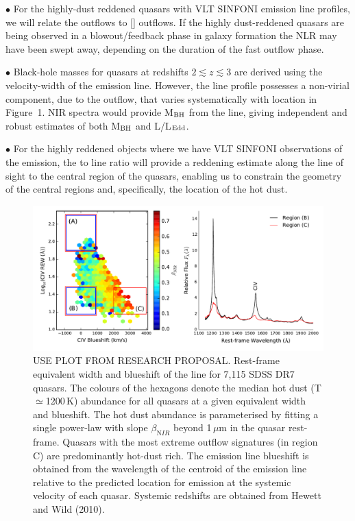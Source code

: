\vspace{1.5mm}

$\bullet$ For the highly-dust reddened quasars with VLT SINFONI
\ha emission line profiles, we will relate the \ha
outflows to [] outflows. If the highly dust-reddened quasars
are being observed in a blowout/feedback phase in galaxy formation the
NLR may have been swept away, depending on the duration of the fast
outflow phase.

$\bullet$ Black-hole masses for quasars at redshifts $2 \lesssim z
\lesssim 3$ are derived using the velocity-width of the 
emission line. However, the  line profile possesses a
non-virial component, due to the outflow, that varies systematically
with location in Figure~1. NIR spectra would provide M$_{\rm{BH}}$
from the \hb line, giving independent and robust estimates of
both M$_{\rm{BH}}$ and L/L$_{\rm{Edd}}$.

$\bullet$ For the highly reddened objects where we have VLT SINFONI
observations of the \ha emission, the \ha to \hb line
ratio will provide a reddening estimate along the line of sight to the
central region of the quasars, enabling us to constrain the geometry
of the central regions and, specifically, the location of the hot
dust.

\begin{figure}
\centering
  \includegraphics[width=\columnwidth]{figures/chapter06/ntt_proposal_figure1.pdf}
\caption{USE PLOT FROM RESEARCH PROPOSAL. Rest-frame equivalent width and blueshift of the
 line for 7,115 SDSS DR7 quasars. The colours of the hexagons
denote the median hot dust (T$\simeq$1200\,K) abundance for all
quasars at a given equivalent width and blueshift. The hot dust
abundance is parameterised by fitting a single power-law with slope
$\beta_{\mathrm NIR}$ beyond 1\,$\mu$m in the quasar rest-frame. Quasars
with the most extreme outflow signatures (in region C) are predominantly
hot-dust rich. The  emission line blueshift is obtained from
the wavelength of the centroid of the emission line relative to the
predicted location for emission at the systemic velocity of each
quasar. Systemic redshifts are obtained from Hewett and Wild (2010).}
  \label{fig:}
\end{figure}

